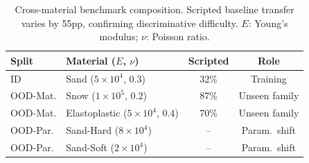 \begin{table}[t]
\centering
\footnotesize
\setlength{\tabcolsep}{3pt}
\renewcommand{\arraystretch}{0.95}
\caption{Cross-material benchmark composition. Scripted baseline transfer varies by 55pp, confirming discriminative difficulty. $E$: Young's modulus; $\nu$: Poisson ratio.}
\label{tab:benchmark}
\begin{tabular}{llcc}
\toprule
Split & Material ($E$, $\nu$) & Scripted & Role \\
\midrule
ID & Sand ($5{\times}10^4$, $0.3$) & 32\% & Training \\
OOD-Mat. & Snow ($1{\times}10^5$, $0.2$) & 87\% & Unseen family \\
OOD-Mat. & Elastoplastic ($5{\times}10^4$, $0.4$) & 70\% & Unseen family \\
OOD-Par. & Sand-Hard ($8{\times}10^4$) & -- & Param.\ shift \\
OOD-Par. & Sand-Soft ($2{\times}10^4$) & -- & Param.\ shift \\
\bottomrule
\end{tabular}
\end{table}
